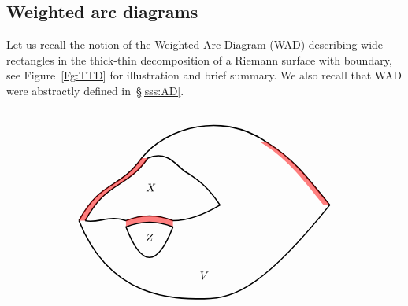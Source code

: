\documentclass{amsart}
\newcommand{\1}{{\mathbb 1 }}
\begin{document}
\subsection{Weighted arc diagrams} \label{ss:WAD} Let us recall the notion of the Weighted Arc Diagram (WAD) describing wide rectangles in the thick-thin decomposition of a Riemann surface with boundary, see Figure~\ref{Fg:TTD} for illustration and brief summary. We also recall that WAD were abstractly defined in~\S\ref{sss:AD}. 






\begin{figure}[t!]
\[\begin{tikzpicture}

\draw[,line width=0.4mm] (0,0)
 .. controls  (0.7, 1.3) and (1.3,1) .. 
 (2,2)
  .. controls  (2.8, 3) and (4.6,3.5) .. 
(6,2.5)
.. controls  (6.8, 2) and (7.2,1.5) .. 
(8,0.5)
.. controls  (6, -2) and (5,-2.5) .. 
(4,-2.5)
.. controls  (3, -2.5) and (1,-2.5) .. 
(0,0);

\node[above] at (4,-2) {$V$};


 
 \draw[opacity=0, fill=red, fill opacity=0.5]
(6,2.5)
.. controls  (6.8, 2) and (7.2,1.5) .. 
(8,0.5)
.. controls  (8,0.5) and (7.8,0.5).. 
(7.8,0.5)
.. controls   (7,1.5)  and (6.6, 2).. 
(5.8,2.5);
 
 \draw[,line width=0.4mm] (0.2,0)
 .. controls  (0.9, 1.3) and (1.5,1) .. 
 (2.2,2)
 .. controls  (2.9, 2.3) and (3.2,1.6) .. 
 (3.5,1.5)
 .. controls  (3.8, 1.3) and (4.1,1.1) .. 
 (4.5,0.5)
.. controls  (4, 0.2) and (3.5,0) .. 
 (3,0)
 .. controls  (2.5, 0.2) and (2,0.2) .. 
(1.5,0)
 .. controls  (1, 0.2) and (0.6,-0.1) .. 
(0.2,0);

\node[below] at (2.3, 1.3) {$X$};


 \draw[opacity=0, fill=red, fill opacity=0.5]
(3,0)
 .. controls  (2.5, 0.2) and (2,0.2) .. 
(1.5,0)
.. controls  (1.5, 0) and (1.5,-0.2) .. 
(1.5,-0.2)
 .. controls  (2, 0.) and (2.5,0) .. 
(3,-0.2);

\draw[,line width=0.4mm] (3,-0.2)
 .. controls  (2.5, 0.) and (2,0) .. 
(1.5,-0.2)
 .. controls  (2, -1.5) and (2.5,-1.5) .. 
(3,-0.2);

\node[below] at (2.25, -0.3) {$Z$};


\draw[opacity=0, fill=red, fill opacity=0.5]
(0,0)
 .. controls  (0.7, 1.3) and (1.3,1) .. 
 (2,2)
  .. controls  (2, 2) and (2.2,2) .. 
(2.2,2)
 .. controls (1.5,1) and (0.9, 1.3)  .. 
(0.2,0);




\end{tikzpicture}\]
\end{figure}
\end{document}
